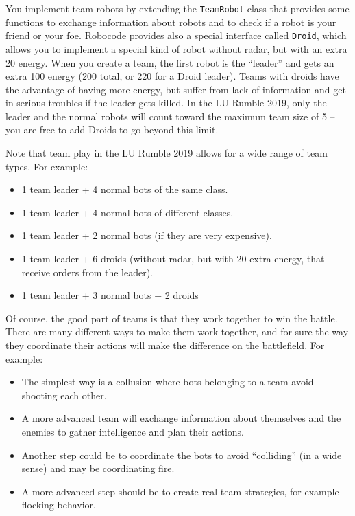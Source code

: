 \documentclass{scrreprt}
\begin{document}
You implement team robots by extending the \texttt{TeamRobot} class that provides some functions to exchange information about robots and to check if a robot is your friend or your foe. Robocode provides also a special interface called \texttt{Droid}, which allows you to implement a special kind of robot without radar, but with an extra 20 energy. When you create a team, the first robot is the ``leader'' and gets an extra 100 energy (200 total, or 220 for a Droid leader). Teams with droids have the advantage of having more energy, but suffer from lack of information and get in serious troubles if the leader gets killed. In the LU Rumble 2019, only the leader and the normal robots will count toward the maximum team size of 5 -- you are free to add Droids to go beyond this limit.

Note that team play in the LU Rumble 2019 allows for a wide range of team types. For example:
\begin{itemize}
\item 1 team leader + 4 normal bots of the same class.
\item 1 team leader + 4 normal bots of different classes.
\item 1 team leader + 2 normal bots (if they are very expensive).
\item 1 team leader + 6 droids (without radar, but with 20 extra energy, that receive orders from the leader).
\item 1 team leader + 3 normal bots + 2 droids
\end{itemize}

Of course, the good part of teams is that they work together to win the battle. There are many different ways to make them work together, and for sure the way they coordinate their actions will make the difference on the battlefield. For example:

\begin{itemize}
\item The simplest way is a collusion where bots belonging to a team avoid shooting each other.
\item A more advanced team will exchange information about themselves and the enemies to gather intelligence and plan their actions.
\item Another step could be to coordinate the bots to avoid ``colliding'' (in a wide sense) and may be coordinating fire.
\item A more advanced step should be to create real team strategies, for example flocking behavior. 
\end{itemize}
    
\end{document}

